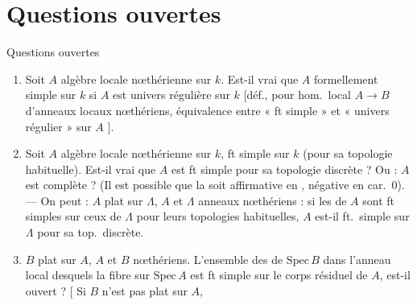\documentclass[11pt,a4paper]{article}
\begin{document}

\section{Questions ouvertes}



Questions ouvertes

\begin{enumerate}
  \item[1)] Soit $A$ algèbre locale nœthérienne sur $k$. Est-il vrai
    que $A$ formellement simple sur $k$ si $A$ est univers
    régulière sur $k$ [déf., pour hom.\ local $A \to B$ d'anneaux locaux
    nœthériens, équivalence entre « ft simple » et « univers
    régulier » sur $A$ ].
  \item[2)] Soit $A$ algèbre locale nœthérienne sur $k$, ft
    simple sur $k$ (pour sa topologie habituelle).
    Est-il vrai que $A$ est ft simple pour sa topologie
    discrète ? Ou : $A$ est complète ? (Il est possible que la
     soit affirmative en ,
    négative en car.\ $0$). --- On peut  \ill{}
     : $A$ plat sur $\Lambda$, $A$ et $\Lambda$ anneaux
    nœthériens : si les \ill{} de $A$ sont ft simples sur ceux de $\Lambda$
    pour leurs topologies habituelles, $A$ est-il ft.\ simple sur $\Lambda$
    pour sa top.\ discrète.
  \item[3)] $B$  plat sur $A$, $A$ et $B$
    nœthériens. L'ensemble des  de $\mathrm{Spec}\,B$ dans
    l'anneau local desquels la fibre sur $\mathrm{Spec}\,A$ est ft simple
    sur le corps résiduel de $A$, est-il ouvert ?
    \struck{\ill{}} [ Si $B$ n'est pas plat sur $A$,
\end{enumerate}
\end{document}
